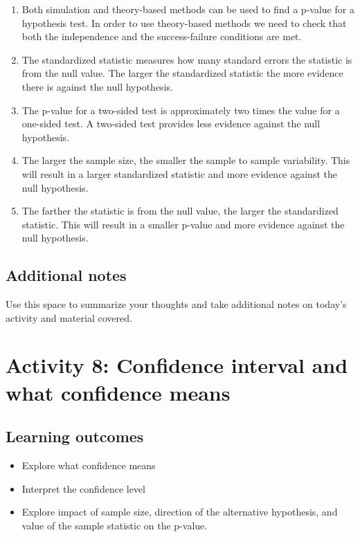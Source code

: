 \documentclass[
]{report}
\begin{document}
\begin{enumerate}
\def\labelenumi{\arabic{enumi}.}
\item
  Both simulation and theory-based methods can be used to find a p-value for a hypothesis test. In order to use theory-based methods we need to check that both the independence and the success-failure conditions are met.
\item
  The standardized statistic measures how many standard errors the statistic is from the null value. The larger the standardized statistic the more evidence there is against the null hypothesis.
\item
  The p-value for a two-sided test is approximately two times the value for a one-sided test. A two-sided test provides less evidence against the null hypothesis.
\item
  The larger the sample size, the smaller the sample to sample variability. This will result in a larger standardized statistic and more evidence against the null hypothesis.
\item
  The farther the statistic is from the null value, the larger the standardized statistic. This will result in a smaller p-value and more evidence against the null hypothesis.
\end{enumerate}

\subsection{Additional notes}\label{additional-notes-6}

Use this space to summarize your thoughts and take additional notes on today's activity and material covered.

\newpage

\section{Activity 8: Confidence interval and what confidence means}\label{activity-8-confidence-interval-and-what-confidence-means}


\subsection{Learning outcomes}\label{learning-outcomes-7}

\begin{itemize}
\item
  Explore what confidence means
\item
  Interpret the confidence level
\item
  Explore impact of sample size, direction of the alternative hypothesis, and value of the sample statistic on the p-value.
\end{itemize}
\end{document}
